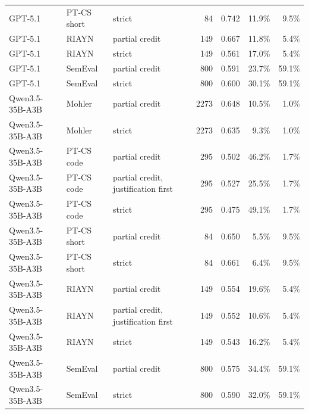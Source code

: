 \documentclass[10pt]{article}
\begin{document}
\begin{longtable}{ll>{\raggedright\arraybackslash}p{3.2cm}rrrr}
GPT-5.1 & PT-CS short & strict & 84 & 0.742 & 11.9\% & 9.5\% \\
GPT-5.1 & RIAYN & partial credit & 149 & 0.667 & 11.8\% & 5.4\% \\
GPT-5.1 & RIAYN & strict & 149 & 0.561 & 17.0\% & 5.4\% \\
GPT-5.1 & SemEval & partial credit & 800 & 0.591 & 23.7\% & 59.1\% \\
GPT-5.1 & SemEval & strict & 800 & 0.600 & 30.1\% & 59.1\% \\
Qwen3.5-35B-A3B & Mohler & partial credit & 2273 & 0.648 & 10.5\% & 1.0\% \\
Qwen3.5-35B-A3B & Mohler & strict & 2273 & 0.635 & 9.3\% & 1.0\% \\
Qwen3.5-35B-A3B & PT-CS code & partial credit & 295 & 0.502 & 46.2\% & 1.7\% \\
Qwen3.5-35B-A3B & PT-CS code & partial credit, justification first & 295 & 0.527 & 25.5\% & 1.7\% \\
Qwen3.5-35B-A3B & PT-CS code & strict & 295 & 0.475 & 49.1\% & 1.7\% \\
Qwen3.5-35B-A3B & PT-CS short & partial credit & 84 & 0.650 & 5.5\% & 9.5\% \\
Qwen3.5-35B-A3B & PT-CS short & strict & 84 & 0.661 & 6.4\% & 9.5\% \\
Qwen3.5-35B-A3B & RIAYN & partial credit & 149 & 0.554 & 19.6\% & 5.4\% \\
Qwen3.5-35B-A3B & RIAYN & partial credit, justification first & 149 & 0.552 & 10.6\% & 5.4\% \\
Qwen3.5-35B-A3B & RIAYN & strict & 149 & 0.543 & 16.2\% & 5.4\% \\
Qwen3.5-35B-A3B & SemEval & partial credit & 800 & 0.575 & 34.4\% & 59.1\% \\
Qwen3.5-35B-A3B & SemEval & strict & 800 & 0.590 & 32.0\% & 59.1\% \\
\hline
\end{longtable}
\endgroup
\end{document}
